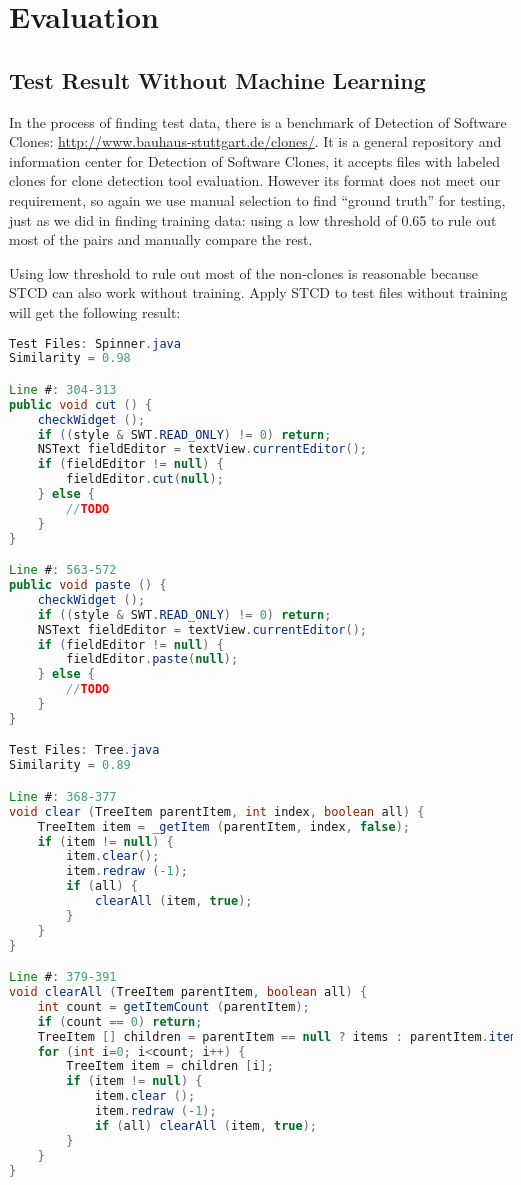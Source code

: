 \documentclass[../main.tex]{subfiles}
\begin{document}
\section{Evaluation}

\subsection{Test Result Without Machine Learning}

In the process of finding test data, there is a benchmark of Detection of Software Clones: {\color{blue} \url{http://www.bauhaus-stuttgart.de/clones/}}. It is a general repository and information center for Detection of Software Clones, it accepts files with labeled clones for clone detection tool evaluation. However its format does not meet our requirement, so again we use manual selection to find ``ground truth'' for testing, just as we did in finding training data: using a low threshold of 0.65 to rule out most of the pairs and manually compare the rest.

Using low threshold to rule out most of the non-clones is reasonable because STCD can also work without training. Apply STCD to test files without training will get the following result:


\begin{lstlisting}[basicstyle=\footnotesize, language=Java]
Test Files: Spinner.java
Similarity = 0.98

Line #: 304-313
public void cut () {
	checkWidget ();
	if ((style & SWT.READ_ONLY) != 0) return;
	NSText fieldEditor = textView.currentEditor();
	if (fieldEditor != null) {
		fieldEditor.cut(null);
	} else {
		//TODO
	}
}

Line #: 563-572
public void paste () {
	checkWidget ();
	if ((style & SWT.READ_ONLY) != 0) return;
	NSText fieldEditor = textView.currentEditor();
	if (fieldEditor != null) {
		fieldEditor.paste(null);
	} else {
		//TODO
	}
}

Test Files: Tree.java
Similarity = 0.89

Line #: 368-377
void clear (TreeItem parentItem, int index, boolean all) {
	TreeItem item = _getItem (parentItem, index, false);
	if (item != null) {
		item.clear();
		item.redraw (-1);
		if (all) {
			clearAll (item, true);
		}
	}
}

Line #: 379-391
void clearAll (TreeItem parentItem, boolean all) {
	int count = getItemCount (parentItem);
	if (count == 0) return;
	TreeItem [] children = parentItem == null ? items : parentItem.items; 
	for (int i=0; i<count; i++) {
		TreeItem item = children [i];
		if (item != null) {
			item.clear ();
			item.redraw (-1);
			if (all) clearAll (item, true);
		}
	}
}
\end{lstlisting}
\end{document}
